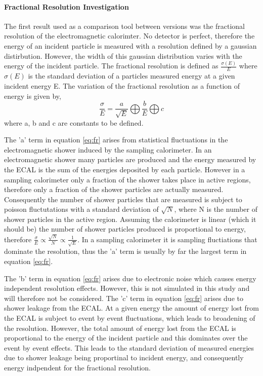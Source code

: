 \paragraph{Fractional Resolution Investigation}
\label{sec:Fractional Resolution Investigation}

The first result used as a comparison tool between \geant versions was the fractional resolution of the electromagnetic calorimter.  No detector is perfect, therefore the energy of an incident particle is measured with a resolution defined by a gaussian distirbution.  However, the width of this gaussian distribution varies with the energy of the incident particle.  The fractional resolution is defined as $\frac{\sigma(E)}{E}$ where $\sigma(E)$ is the standard deviation of a particles measured energy at a given incident energy E.  The variation of the fractional resolution as a function of energy is given by, 
\begin{equation}\label{eq:fr}
\frac{\sigma}{E}=\frac{a}{\sqrt{E}} \bigoplus \frac{b}{E} \bigoplus c
\end{equation}
where a, b and c are constants to be defined\cite{wigmans2000calorimetry}.  

The 'a' term in equation \ref{eq:fr} arises from statistical fluctuations in the electromagnetic shower induced by the sampling calorimeter.  In an electromagnetic shower many particles are produced and the energy measured by the ECAL is the sum of the energies deposited by each particle.  However in a sampling calorimeter only a fraction of the shower takes place in active regions, therefore only a fraction of the shower particles are actually measured.  Consequently the number of shower particles that are measured is subject to poisson fluctutations with a standard deviation of $\sqrt{N}$, where N is the number of shower particles in the active region.  Assuming the calorimeter is linear (which it should be) the number of shower particles produced is proportional to energy, therefore $\frac{\sigma}{E} \propto \frac{\sqrt{N}}{N} \propto \frac{1}{\sqrt{E}}$. In a sampling calorimeter it is sampling fluctiations that dominate the resolution, thus the 'a' term is usually by far the largest term in equation \ref{eq:fr}.  

The 'b' term in equation \ref{eq:fr} arises due to electronic noise which causes energy independent resolution effects.  However, this is not simulated in this study and will therefore not be considered.  The 'c' term in equation \ref{eq:fr} arises due to shower leakage from the ECAL.  At a given energy the amount of energy lost from the ECAL is subject to event by event fluctuations, which leads to broadening of the resolution.  However, the total amount of energy lost from the ECAL is proportional to the energy of the incident particle and this dominates over the event by event effects.  This leads to the standard deviation of measured energies due to shower leakage being proportinal to incident energy, and consequently energy indpendent for the fractional resolution.

